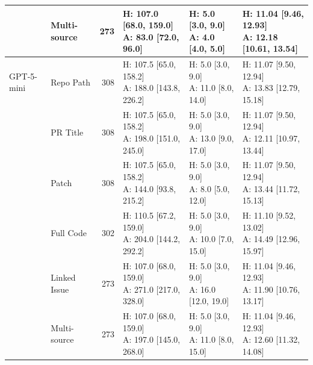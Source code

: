 \begin{table}[tp]
\begin{tabular}{llrlll}
 & Multi-source & 273 & \shortstack[l]{H: 107.0 [68.0, 159.0]\\A: 83.0 [72.0, 96.0]} & \shortstack[l]{H: 5.0 [3.0, 9.0]\\A: 4.0 [4.0, 5.0]} & \shortstack[l]{H: 11.04 [9.46, 12.93]\\A: 12.18 [10.61, 13.54]} \\
\midrule
GPT-5-mini & Repo Path & 308 & \shortstack[l]{H: 107.5 [65.0, 158.2]\\A: 188.0 [143.8, 226.2]} & \shortstack[l]{H: 5.0 [3.0, 9.0]\\A: 11.0 [8.0, 14.0]} & \shortstack[l]{H: 11.07 [9.50, 12.94]\\A: 13.83 [12.79, 15.18]} \\
 & PR Title & 308 & \shortstack[l]{H: 107.5 [65.0, 158.2]\\A: 198.0 [151.0, 245.0]} & \shortstack[l]{H: 5.0 [3.0, 9.0]\\A: 13.0 [9.0, 17.0]} & \shortstack[l]{H: 11.07 [9.50, 12.94]\\A: 12.11 [10.97, 13.44]} \\
 & Patch & 308 & \shortstack[l]{H: 107.5 [65.0, 158.2]\\A: 144.0 [93.8, 215.2]} & \shortstack[l]{H: 5.0 [3.0, 9.0]\\A: 8.0 [5.0, 12.0]} & \shortstack[l]{H: 11.07 [9.50, 12.94]\\A: 13.44 [11.72, 15.13]} \\
 & Full Code & 302 & \shortstack[l]{H: 110.5 [67.2, 159.0]\\A: 204.0 [144.2, 292.2]} & \shortstack[l]{H: 5.0 [3.0, 9.0]\\A: 10.0 [7.0, 15.0]} & \shortstack[l]{H: 11.10 [9.52, 13.02]\\A: 14.49 [12.96, 15.97]} \\
 & Linked Issue & 273 & \shortstack[l]{H: 107.0 [68.0, 159.0]\\A: 271.0 [217.0, 328.0]} & \shortstack[l]{H: 5.0 [3.0, 9.0]\\A: 16.0 [12.0, 19.0]} & \shortstack[l]{H: 11.04 [9.46, 12.93]\\A: 11.90 [10.76, 13.17]} \\
 & Multi-source & 273 & \shortstack[l]{H: 107.0 [68.0, 159.0]\\A: 197.0 [145.0, 268.0]} & \shortstack[l]{H: 5.0 [3.0, 9.0]\\A: 11.0 [8.0, 15.0]} & \shortstack[l]{H: 11.04 [9.46, 12.93]\\A: 12.60 [11.32, 14.08]} \\

\end{tabular}
\end{table}
